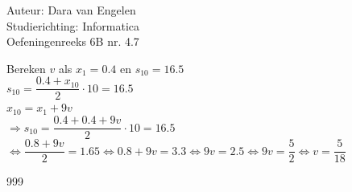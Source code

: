 \documentclass[a4paper]{article}
\begin{document}
	
\noindent \large Auteur: Dara van Engelen     \\
\noindent \large Studierichting: Informatica \\
\noindent \large Oefeningenreeks 6B nr. 4.7 \\
	
\medskip
	
\normalsize

Bereken $v$ als $x_1 = 0.4$ en $s_{10} = 16.5$\\

$s_{10} = \dfrac{0.4+x_{10}}{2} \cdot 10 = 16.5 $\\

$x_{10} = x_1+9v$\\

$\Rightarrow s_{10} = \dfrac{0.4 + 0.4 + 9v}{2} \cdot 10 = 16.5$\\

$\Leftrightarrow \dfrac{0.8 + 9v}{2} = 1.65 \Leftrightarrow 0.8 + 9v = 3.3 \Leftrightarrow 9v = 2.5 \Leftrightarrow 9v = \dfrac{5}{2} \Leftrightarrow v = \dfrac{5}{18}$\\


	
\begin{thebibliography}{999}
\end{thebibliography}
\end{document}
